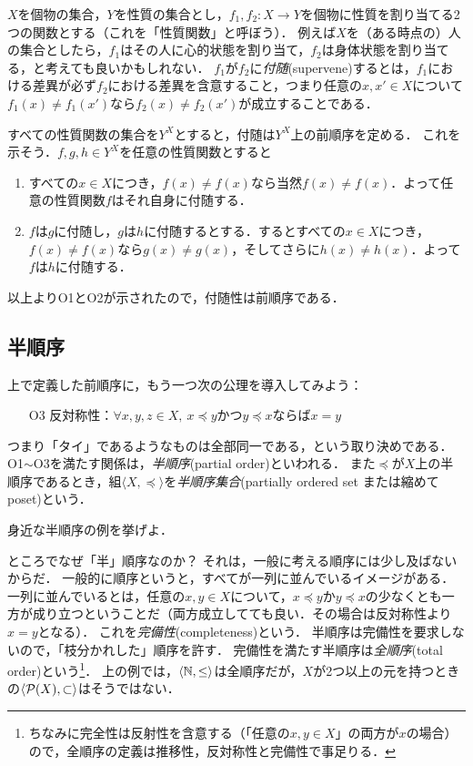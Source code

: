 \documentclass[11pt,a4paper]{jsarticle}
\begin{document}
\begin{example}[Supervenience]
 $X$を個物の集合，$Y$を性質の集合とし，$f_1, f_2:X \to Y$を個物に性質を割り当てる2つの関数とする（これを「性質関数」と呼ぼう）．
 例えば$X$を（ある時点の）人の集合としたら，$f_1$はその人に心的状態を割り当て，$f_2$は身体状態を割り当てる，と考えても良いかもしれない．
 $f_1$が$f_2$に\emph{付随}(supervene)するとは，$f_1$における差異が必ず$f_2$における差異を含意すること，つまり任意の$x, x' \in X$について$f_1(x) \neq f_1(x')$なら$f_2(x) \neq f_2(x')$が成立することである．

 すべての性質関数の集合を$Y^X$とすると，付随は$Y^X$上の前順序を定める．
 これを示そう．$f, g, h \in Y^X$を任意の性質関数とすると
 \begin{enumerate}
  \item すべての$x \in X$につき，$f(x) \neq f(x)$なら当然$f(x) \neq f(x)$．よって任意の性質関数$f$はそれ自身に付随する．
  \item $f$は$g$に付随し，$g$は$h$に付随するとする．するとすべての$x \in X$につき，$f(x) \neq f(x)$なら$g(x) \neq g(x)$，そしてさらに$h(x) \neq h(x)$．よって$f$は$h$に付随する．
 \end{enumerate}
以上よりO1とO2が示されたので，付随性は前順序である．
\end{example}
   

\subsection{半順序}
上で定義した前順序に，もう一つ次の公理を導入してみよう：
\begin{itemize}
 \item[O3] 反対称性：$\forall x, y, z \in X, \ x \preceq y$かつ$y \preceq x$ならば$x = y$
\end{itemize}
つまり「タイ」であるようなものは全部同一である，という取り決めである．
O1$\sim$O3を満たす関係は，\emph{半順序}(partial order)といわれる．
また$\preceq$が$X$上の半順序であるとき，組$\langle X, \preceq \rangle$を\emph{半順序集合}(partially ordered set または縮めて poset)という．

\begin{exercise}
 身近な半順序の例を挙げよ．
\end{exercise}



ところでなぜ「半」順序なのか？
それは，一般に考える順序には少し及ばないからだ．
一般的に順序というと，すべてが一列に並んでいるイメージがある．
一列に並んでいるとは，任意の$x, y \in X$について，$x \preceq y$か$y \preceq x$の少なくとも一方が成り立つということだ（両方成立してても良い．その場合は反対称性より$x=y$となる）．
これを\emph{完備性}(completeness)という．
半順序は完備性を要求しないので，「枝分かれした」順序を許す．
完備性を満たす半順序は\emph{全順序}(total order)という\footnote{ちなみに完全性は反射性を含意する（「任意の$x,y \in X$」の両方が$x$の場合）ので，全順序の定義は推移性，反対称性と完備性で事足りる．}．
%
上の例では，$\langle \mathbb{N}, \leq \rangle$は全順序だが，$X$が2つ以上の元を持つときの$\langle \mathcal{P}(X), \subset \rangle$はそうではない．
\end{document}
